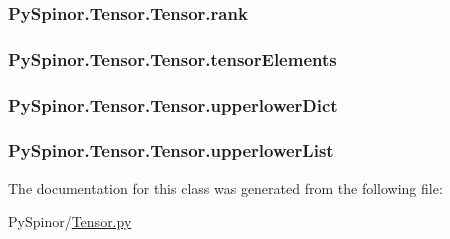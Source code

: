 \subsubsection[{rank}]{\setlength{\rightskip}{0pt plus 5cm}Py\+Spinor.\+Tensor.\+Tensor.\+rank}\label{class_py_spinor_1_1_tensor_1_1_tensor_af112f0319ea0f98158ed9fe744883193}
\hypertarget{class_py_spinor_1_1_tensor_1_1_tensor_ada0b84b1edfe3b3426c870fa8e7cfe2c}{}
\subsubsection[{tensor\+Elements}]{\setlength{\rightskip}{0pt plus 5cm}Py\+Spinor.\+Tensor.\+Tensor.\+tensor\+Elements}\label{class_py_spinor_1_1_tensor_1_1_tensor_ada0b84b1edfe3b3426c870fa8e7cfe2c}
\hypertarget{class_py_spinor_1_1_tensor_1_1_tensor_aa9242fc2995ce134649f8ae71a21cd13}{}
\subsubsection[{upperlower\+Dict}]{\setlength{\rightskip}{0pt plus 5cm}Py\+Spinor.\+Tensor.\+Tensor.\+upperlower\+Dict}\label{class_py_spinor_1_1_tensor_1_1_tensor_aa9242fc2995ce134649f8ae71a21cd13}
\hypertarget{class_py_spinor_1_1_tensor_1_1_tensor_a4ec7810efac6ce40cd7b44c78446ba5a}{}
\subsubsection[{upperlower\+List}]{\setlength{\rightskip}{0pt plus 5cm}Py\+Spinor.\+Tensor.\+Tensor.\+upperlower\+List}\label{class_py_spinor_1_1_tensor_1_1_tensor_a4ec7810efac6ce40cd7b44c78446ba5a}


The documentation for this class was generated from the following file\+:\begin{DoxyCompactItemize}
\item 
Py\+Spinor/\hyperlink{_tensor_8py}{Tensor.\+py}\end{DoxyCompactItemize}

